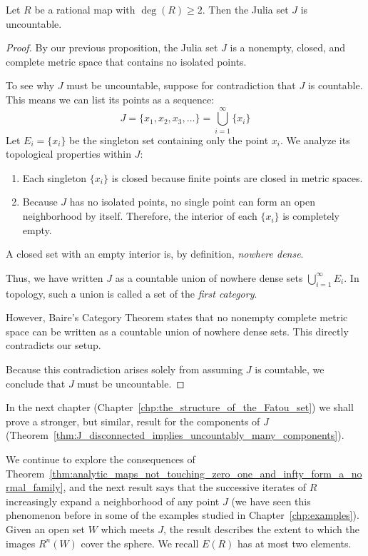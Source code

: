\begin{theorem}[$J$ is uncountable]
    \label{thm:J_is_uncountable}
    Let $R$ be a rational map with $\deg(R) \geq 2$. Then the Julia set $J$ is
    uncountable.
\end{theorem}
\begin{proof}
    By our previous proposition, the Julia set $J$ is a nonempty, closed, and
    complete metric space that contains no isolated points. 
    
    To see why $J$ must be uncountable, suppose for contradiction that $J$ is
    countable. This means we can list its points as a sequence:
    \begin{equation*}
    J = \{x_1, x_2, x_3, \dots\} = \bigcup_{i=1}^{\infty} \{x_i\}
    \end{equation*}
    Let $E_i = \{x_i\}$ be the singleton set containing only the point $x_i$. We
    analyze its topological properties within $J$:
    \begin{enumerate}[label=(\roman*)]
        \item Each singleton $\{x_i\}$ is closed because finite points are
        closed in metric spaces.
        \item Because $J$ has no isolated points, no single point can form an
        open neighborhood by itself. Therefore, the interior of each $\{x_i\}$
        is completely empty.
    \end{enumerate}
    A closed set with an empty interior is, by definition, \emph{nowhere dense}. 
    
    Thus, we have written $J$ as a countable union of nowhere dense sets
    $\bigcup_{i=1}^{\infty} E_i$. In topology, such a union is called a set of
    the \emph{first category}. 
    
    However, Baire's Category Theorem states that no nonempty complete metric
    space can be written as a countable union of nowhere dense sets. This
    directly contradicts our setup. 
    
    Because this contradiction arises solely from assuming $J$ is countable, we
    conclude that $J$ must be uncountable.
\end{proof}

In the next chapter (Chapter~\ref{chp:the_structure_of_the_Fatou_set}) we shall
prove a stronger, but similar, result for the components of $J$
(Theorem~\ref{thm:J_disconnected_implies_uncountably_many_components}).

We continue to explore the consequences of
Theorem~\ref{thm:analytic_maps_not_touching_zero_one_and_infty_form_a_normal_family},
and the next result says that the successive iterates of $R$ increasingly expand
a neighborhood of any point $J$ (we have seen this phenomenon before in some of
the examples studied in Chapter~\ref{chp:examples}). Given an open set $W$ which
meets $J$, the result describes the extent to which the images $R^n(W)$ cover
the sphere. We recall $E(R)$ has at most two elements.

